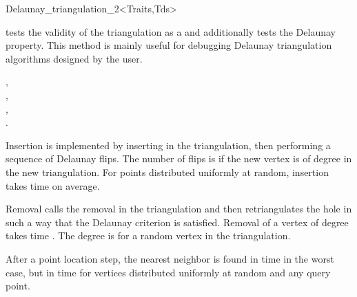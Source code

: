 \begin{ccRefClass}{Delaunay_triangulation_2<Traits,Tds>}
\begin{ccAdvanced}
{ tests the validity of the triangulation as a 
and additionally tests the Delaunay property. This method is
 mainly  useful for debugging Delaunay triangulation algorithms designed by
 the user.}
\end{ccAdvanced}




\ccSeeAlso

, \\
, \\
, \\
.





Insertion is implemented by inserting in the triangulation, then
performing a sequence of Delaunay flips. The number of flips is 
if the new vertex is of degree  in the new triangulation. For
points distributed uniformly at random, insertion takes time  on
average.

Removal calls the removal in the triangulation and then retriangulates
the hole in such a way that  the Delaunay criterion is satisfied. Removal of a
vertex of degree  takes time .
The degree  is  for a random
vertex in the triangulation.

After a point location step, the nearest neighbor 
is found in time  in the
worst case, but in time 
for vertices distributed uniformly at random  and any query point. 


\end{ccRefClass}



